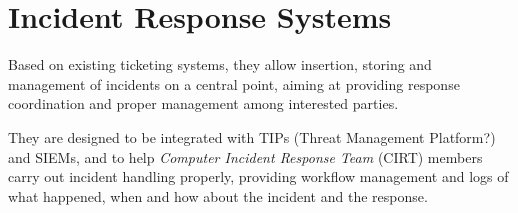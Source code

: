 \section{Incident Response Systems}

Based on existing ticketing systems, they allow insertion, storing and management of incidents on a central
point, aiming at providing response coordination and proper management among interested parties.

They are designed to be integrated with TIPs (Threat Management Platform?) and SIEMs, and to help \textit{Computer Incident Response Team} (\textsc{CIRT}) members carry out
incident handling properly, providing workflow management and logs of what happened, when and how about the incident and the response.